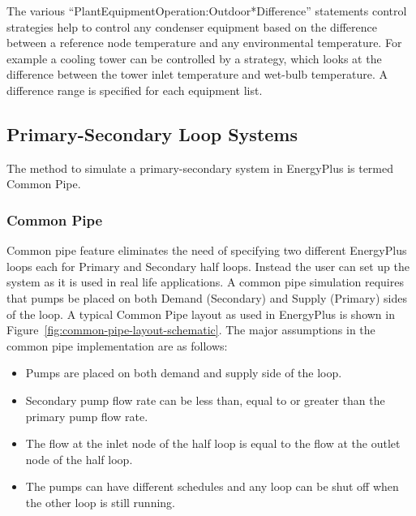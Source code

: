 The various ``PlantEquipmentOperation:Outdoor*Difference'' statements control strategies help to control any condenser equipment based on the difference between a reference node temperature and any environmental temperature. For example a cooling tower can be controlled by a strategy, which looks at the difference between the tower inlet temperature and wet-bulb temperature. A difference range is specified for each equipment list.

\subsection{Primary-Secondary Loop Systems}\label{primary-secondary-loop-systems}

The method to simulate a primary-secondary system in EnergyPlus is termed Common Pipe.

\subsubsection{Common Pipe}\label{common-pipe}

Common pipe feature eliminates the need of specifying two different EnergyPlus loops each for Primary and Secondary half loops. Instead the user can set up the system as it is used in real life applications. A common pipe simulation requires that pumps be placed on both Demand (Secondary) and Supply (Primary) sides of the loop. A typical Common Pipe layout as used in EnergyPlus is shown in Figure~\ref{fig:common-pipe-layout-schematic}. The major assumptions in the common pipe implementation are as follows:

\begin{itemize}
\item
  Pumps are placed on both demand and supply side of the loop.
\item
  Secondary pump flow rate can be less than, equal to or greater than the primary pump flow rate.
\item
  The flow at the inlet node of the half loop is equal to the flow at the outlet node of the half loop.
\item
  The pumps can have different schedules and any loop can be shut off when the other loop is still running.
\end{itemize}

